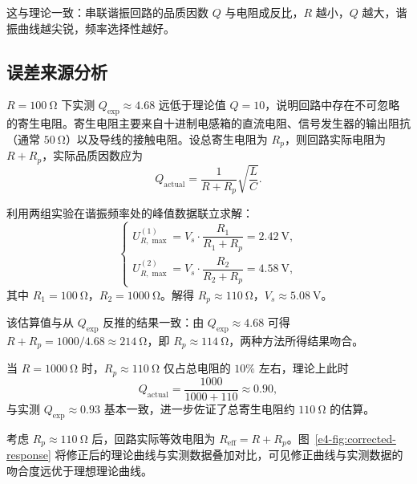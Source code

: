 这与理论一致：串联谐振回路的品质因数 \(Q\) 与电阻成反比，\(R\) 越小，\(Q\) 越大，谐振曲线越尖锐，频率选择性越好。

\subsection{误差来源分析}

\(R=\SI{100}{\ohm}\) 下实测 \(Q_{\exp}\approx 4.68\) 远低于理论值 \(Q=10\)，说明回路中存在不可忽略的寄生电阻。寄生电阻主要来自十进制电感箱的直流电阻、信号发生器的输出阻抗（通常 \(\SI{50}{\ohm}\)）以及导线的接触电阻。设总寄生电阻为 \(R_{p}\)，则回路实际电阻为 \(R+R_{p}\)，实际品质因数应为
\begin{equation}
    Q_{\text{actual}} = \frac{1}{R+R_{p}}\sqrt{\frac{L}{C}}.
\end{equation}

利用两组实验在谐振频率处的峰值数据联立求解：
\begin{equation}
    \begin{cases}
    U_{R,\max}^{(1)} = V_{s}\cdot\dfrac{R_{1}}{R_{1}+R_{p}} = \SI{2.42}{\volt}, \\[6pt]
    U_{R,\max}^{(2)} = V_{s}\cdot\dfrac{R_{2}}{R_{2}+R_{p}} = \SI{4.58}{\volt},
    \end{cases}
\end{equation}
其中 \(R_{1}=\SI{100}{\ohm}\)，\(R_{2}=\SI{1000}{\ohm}\)。解得 \(R_{p}\approx\SI{110}{\ohm}\)，\(V_{s}\approx\SI{5.08}{\volt}\)。

该估算值与从 \(Q_{\exp}\) 反推的结果一致：由 \(Q_{\exp}\approx 4.68\) 可得 \(R+R_{p}=1000/4.68\approx\SI{214}{\ohm}\)，即 \(R_{p}\approx\SI{114}{\ohm}\)，两种方法所得结果吻合。

当 \(R=\SI{1000}{\ohm}\) 时，\(R_{p}\approx\SI{110}{\ohm}\) 仅占总电阻的 \(10\%\) 左右，理论上此时
\begin{equation}
    Q_{\text{actual}} = \frac{1000}{1000+110} \approx 0.90,
\end{equation}
与实测 \(Q_{\exp}\approx 0.93\) 基本一致，进一步佐证了总寄生电阻约 \(\SI{110}{\ohm}\) 的估算。

考虑 \(R_{p}\approx\SI{110}{\ohm}\) 后，回路实际等效电阻为 \(R_{\text{eff}}=R+R_{p}\)。图~\ref{e4-fig:corrected-response} 将修正后的理论曲线与实测数据叠加对比，可见修正曲线与实测数据的吻合度远优于理想理论曲线。

